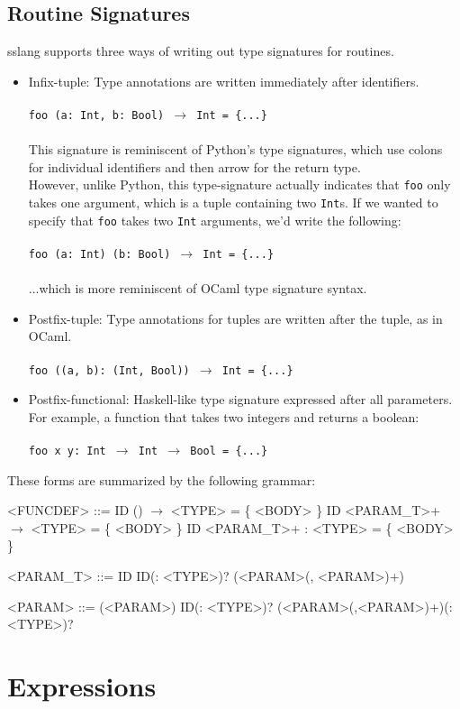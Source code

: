 \documentclass{article}
\begin{document}
\subsection{Routine Signatures}
\noindent sslang supports three ways of writing out type signatures for routines.
\begin{itemize}
    \item Infix-tuple: Type annotations are written immediately after identifiers.\\\\
    \texttt{foo (a: Int, b: Bool) $\rightarrow$ Int = \{...\}}\\\\
    This signature is reminiscent of Python's type signatures, which use colons for individual identifiers and then arrow for the return type.\\
    
    However, unlike Python, this type-signature actually indicates that \texttt{foo} only takes one argument, which is a tuple containing two \texttt{Int}s. If we wanted to specify that \texttt{foo} takes two \texttt{Int} arguments, we'd write the following:\\\\
    \texttt{foo (a: Int) (b: Bool) $\rightarrow$ Int = \{...\}}\\\\
    ...which is more reminiscent of OCaml type signature syntax.
    
    \item Postfix-tuple: Type annotations for tuples are written after the tuple, as in OCaml.\\\\
    \texttt{foo ((a, b): (Int, Bool)) $\rightarrow$ Int = \{...\}}
    \item Postfix-functional: Haskell-like type signature expressed after all parameters. For example, a function that takes two integers and returns a boolean:\\\\
    \texttt{foo x y: Int $\rightarrow$ Int $\rightarrow$ Bool = \{...\}}
\end{itemize}

\noindent These forms are summarized by the following grammar:
\setlength{\grammarindent}{5em}
\begin{grammar}
<FUNCDEF> ::= ID () $\rightarrow$ <TYPE> = \{ <BODY> \}
\alt ID <PARAM_T>+ $\rightarrow$ <TYPE> = \{ <BODY> \}
\alt ID <PARAM_T>+ : <TYPE> = \{ <BODY> \}

<PARAM_T> ::= ID
\alt ID(: <TYPE>)?
\alt (<PARAM>(, <PARAM>)+)

<PARAM> ::= (<PARAM>)
\alt ID(: <TYPE>)?
\alt (<PARAM>(,<PARAM>)+)(: <TYPE>)?
\end{grammar}

\section{Expressions}
\end{document}
